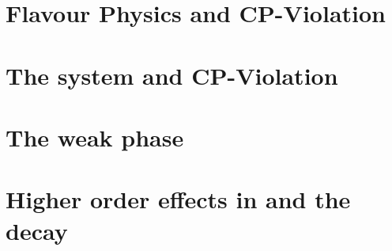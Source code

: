 \section{Flavour Physics and CP-Violation}
\label{Flavour_Physics}



\section{The \Bs system and CP-Violation}
\label{Phenomenology}


\section{The weak phase \phis}
\label{WeakPhase}


\section{Higher order effects in \phis and the \BsJpsiKst decay}
\label{TheBsJpsiKstDecay}

